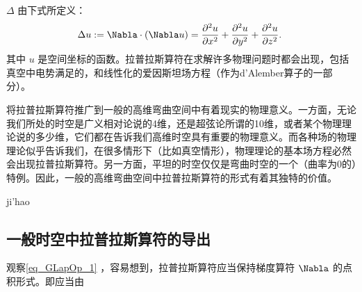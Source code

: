 
 $\Delta$ 由下式所定义：
\begin{equation}\label{eq_GLapOp_1}
\Delta u:=\Nabla\cdot (\Nabla u)=\frac{\partial^{2}{u}}{\partial{x}^{2}} + \frac{\partial^{2}{u}}{\partial{y}^{2}} + \frac{\partial^{2}{u}}{\partial{z}^{2}}.~
\end{equation}
其中 $u$ 是空间坐标的函数。拉普拉斯算符在求解许多物理问题时都会出现，包括真空中电势满足的，和线性化的爱因斯坦场方程（作为d'Alember算子的一部分）。

将拉普拉斯算符推广到一般的高维弯曲空间中有着现实的物理意义。一方面，无论我们所处的时空是广义相对论说的4维，还是超弦论所谓的10维，或者某个物理理论说的多少维，它们都在告诉我们高维时空具有重要的物理意义。而各种场的物理理论似乎告诉我们，在很多情形下（比如真空情形），物理理论的基本场方程必然会出现拉普拉斯算符。另一方面，平坦的时空仅仅是弯曲时空的一个（曲率为0的）特例。因此，一般的高维弯曲空间中拉普拉斯算符的形式有着其独特的价值。

ji'hao

\subsection{一般时空中拉普拉斯算符的导出}
观察\autoref{eq_GLapOp_1} ，容易想到，拉普拉斯算符应当保持梯度算符 $\Nabla$ 的点积形式。即应当由






